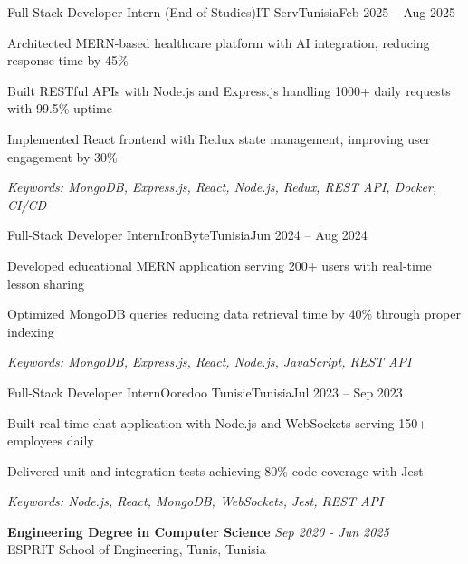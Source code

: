 \documentclass[11pt,a4paper]{article}
\begin{document}
\makecvheader
\makecontactinfo


\begin{internship}{Full-Stack Developer Intern (End-of-Studies)}{IT Serv}{Tunisia}{Feb 2025 -- Aug 2025}{}
  \item Architected MERN-based healthcare platform with AI integration, reducing response time by 45\%
  \item Built RESTful APIs with Node.js and Express.js handling 1000+ daily requests with 99.5\% uptime
  \item Implemented React frontend with Redux state management, improving user engagement by 30\%
  \item[] \textit{\footnotesize Keywords: MongoDB, Express.js, React, Node.js, Redux, REST API, Docker, CI/CD}
\end{internship}

\begin{internship}{Full-Stack Developer Intern}{IronByte}{Tunisia}{Jun 2024 -- Aug 2024}{}
  \item Developed educational MERN application serving 200+ users with real-time lesson sharing
  \item Optimized MongoDB queries reducing data retrieval time by 40\% through proper indexing
  \item[] \textit{\footnotesize Keywords: MongoDB, Express.js, React, Node.js, JavaScript, REST API}
\end{internship}

\begin{internship}{Full-Stack Developer Intern}{Ooredoo Tunisie}{Tunisia}{Jul 2023 -- Sep 2023}{}
  \item Built real-time chat application with Node.js and WebSockets serving 150+ employees daily
  \item Delivered unit and integration tests achieving 80\% code coverage with Jest
  \item[] \textit{\footnotesize Keywords: Node.js, React, MongoDB, WebSockets, Jest, REST API}
\end{internship}

\textbf{Engineering Degree in Computer Science} \hfill \textit{Sep 2020 - Jun 2025}\\[-2pt]
ESPRIT School of Engineering, Tunis, Tunisia
\end{document}
